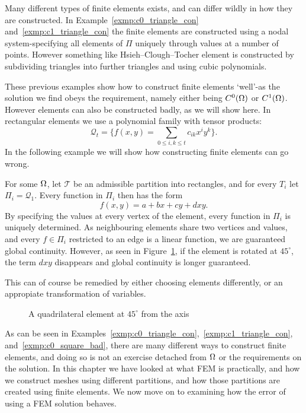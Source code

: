 Many different types of finite elements exists, and can differ wildly in how they 
are constructed. In Example~\ref{exmp:c0_triangle_con} and~\ref{exmp:c1_triangle_con} 
the finite elements are constructed using a nodal system-specifying all elements of $\Pi$ 
uniquely through values at a number of points. However something like Hsieh–Clough–Tocher element 
is constructed by subdividing triangles into further triangles and using 
cubic polynomials.

These previous examples show how to construct finite elements `well'-as 
the solution we find obeys the requirement, namely either being $C^0(\Omega)$ or 
$C^1(\Omega)$. However elements can also be constructed badly, as we will 
show here. In rectangular elements we use a polynomial family with 
tensor products:
\begin{equation*}
    \mathcal{Q}_t = \{ f(x,y)= \sum_{0\leq i,k \leq t} c_{ik}x^i y^k \}.
\end{equation*}
In the following example we will show how constructing finite elements 
can go wrong.
\begin{exmp}{\quad\label{exmp:c0_square_bad}}
   For some $\Omega$, let $\mathcal{T}$ be an admissible partition into 
   rectangles, and for every $T_i$ let $\Pi_i = \mathcal{Q}_1$. 
   Every function in $\Pi_i$ then has the form 
   \begin{equation*}
    f(x,y) = a + bx + cy + dxy.
   \end{equation*}
   By specifying the values at every vertex of the element, every 
   function in $\Pi_i$ is uniquely determined. 
   As neighbouring elements share two vertices and values, and every $f\in\Pi_i$
   restricted to an edge is a linear function, we are guaranteed global 
   continuity. However, 
    as seen in Figure~\ref{fig:quad_element_bad}, if the element is rotated 
   at $45^\circ$, the term $dxy$ disappears and global continuity is longer 
   guaranteed.

   This can of course be remedied by either choosing elements differently, 
   or an appropiate transformation of variables.
\end{exmp}
\begin{figure}[ht]
    \centering
    
    \caption{A quadrilateral element at $45^\circ$ from the axis}\label{fig:quad_element_bad}
\end{figure}
As can be seen in Examples~\ref{exmp:c0_triangle_con},~\ref{exmp:c1_triangle_con}, 
and~\ref{exmp:c0_square_bad}, there are many different ways to construct 
finite elements, and doing so is not an exercise detached from $\Omega$ or 
the requirements on the solution. In this chapter we have looked at what FEM is practically, and how we construct 
meshes using different partitions, and how those partitions are created using 
finite elements. We now move on to examining how the error of using a 
FEM solution behaves.